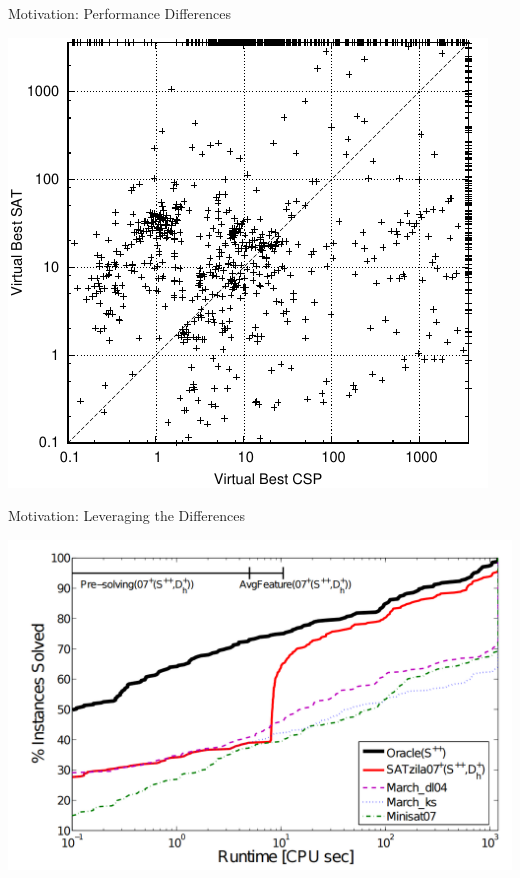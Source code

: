 \begin{frame}[c,allowframebreaks]{Motivation: Performance Differences }
\begin{center}
\includegraphics[height=.65\textheight]{images/csp_v_sat}
\end{center}

\end{frame}

\begin{frame}[c]{Motivation: Leveraging the Differences }
\begin{center}
\includegraphics[height=.7\textheight]{images/satzilla}
\end{center}
\end{frame}


